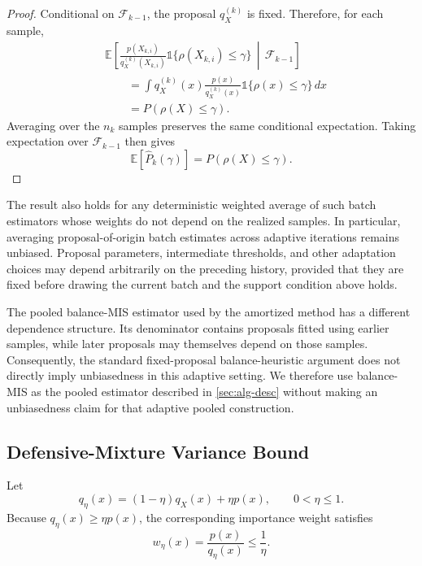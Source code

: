 \begin{proof}
Conditional on $\mathcal F_{k-1}$, the proposal $q_X^{(k)}$ is fixed. Therefore, for each sample,
\[
\begin{aligned}
    &
    \mathbb E
    \left[
        \frac{
            p(X_{k,i})
        }{
            q_X^{(k)}(X_{k,i})
        }
        \mathds{1}\{
            \rho(X_{k,i})\leq\gamma
        \}
        \,\middle|\,
        \mathcal F_{k-1}
    \right]
    \\
    &\qquad=
    \int
    q_X^{(k)}(x)
    \frac{
        p(x)
    }{
        q_X^{(k)}(x)
    }
    \mathds{1}\{
        \rho(x)\leq\gamma
    \}\,dx \\
    &\qquad=
    P(\rho(X)\leq\gamma).
\end{aligned}
\]
Averaging over the $n_k$ samples preserves the same conditional expectation. Taking expectation over $\mathcal F_{k-1}$ then gives
\[
    \mathbb E[
        \widehat P_k(\gamma)
    ]
    =
    P(\rho(X)\leq\gamma).
\]
\end{proof}

The result also holds for any deterministic weighted average of such batch estimators whose weights do not depend on the realized samples. In particular, averaging proposal-of-origin batch estimates across adaptive iterations remains unbiased. Proposal parameters, intermediate thresholds, and other adaptation choices may depend arbitrarily on the preceding history, provided that they are fixed before drawing the current batch and the support condition above holds.

The pooled balance-MIS estimator used by the amortized method has a different dependence structure. Its denominator contains proposals fitted using earlier samples, while later proposals may themselves depend on those samples. Consequently, the standard fixed-proposal balance-heuristic argument does not directly imply unbiasedness in this adaptive setting. We therefore use balance-MIS as the pooled estimator described in \cref{sec:alg-desc} without making an unbiasedness claim for that adaptive pooled construction.

\subsection{Defensive-Mixture Variance Bound}
\label{app:defensive-bound}

Let
\[
    q_\eta(x)
    =
    (1-\eta)q_X(x)+\eta p(x),
    \qquad
    0<\eta\leq1.
\]
Because $q_\eta(x)\geq\eta p(x)$, the corresponding importance weight satisfies
\[
    w_\eta(x)
    =
    \frac{
        p(x)
    }{
        q_\eta(x)
    }
    \leq
    \frac{1}{\eta}.
\]

